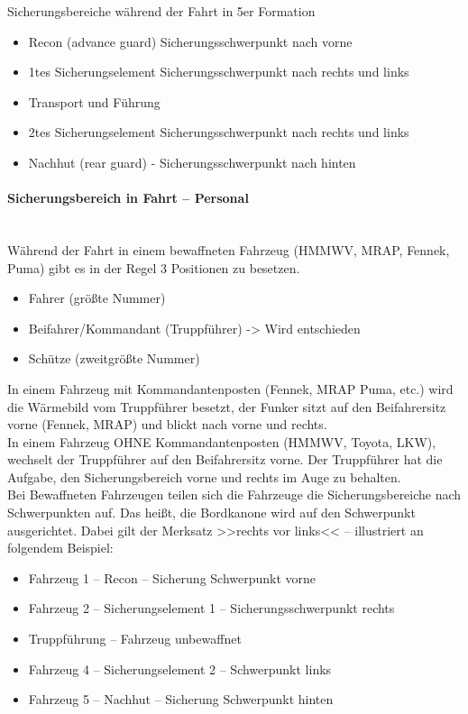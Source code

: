 Sicherungsbereiche während der Fahrt in 5er Formation

	\begin{itemize}
		\item Recon (advance guard) Sicherungsschwerpunkt nach vorne
		\item 1tes Sicherungselement Sicherungsschwerpunkt nach rechts und links
		\item Transport und Führung  
		\item 2tes Sicherungselement Sicherungsschwerpunkt nach rechts und links
		\item Nachhut (rear guard) - Sicherungsschwerpunkt nach hinten
	\end{itemize}

\paragraph{Sicherungsbereich in Fahrt – Personal} \ \\
	Während der Fahrt in einem bewaffneten Fahrzeug (HMMWV, MRAP, Fennek, Puma) gibt es in der Regel 3 Positionen zu besetzen.

	\begin{itemize}
		\item Fahrer (größte Nummer)
		\item Beifahrer/Kommandant (Truppführer) -> Wird entschieden
		\item Schütze (zweitgrößte Nummer)
	\end{itemize}

	In einem Fahrzeug mit Kommandantenposten (Fennek, MRAP Puma, etc.) wird die Wärmebild vom Truppführer besetzt, der Funker sitzt auf den Beifahrersitz vorne (Fennek, MRAP) und blickt nach vorne und rechts. \\
	In einem Fahrzeug OHNE Kommandantenposten (HMMWV, Toyota, LKW), wechselt der Truppführer auf den Beifahrersitz vorne. Der Truppführer hat die Aufgabe, den Sicherungsbereich vorne und rechts im Auge zu behalten. \\
	Bei Bewaffneten Fahrzeugen teilen sich die Fahrzeuge die Sicherungsbereiche nach Schwerpunkten auf. Das heißt, die Bordkanone wird auf den Schwerpunkt ausgerichtet. Dabei gilt der Merksatz >>rechts vor links<< – illustriert an folgendem Beispiel: 

	\begin{itemize}
		\item Fahrzeug 1 – Recon – Sicherung Schwerpunkt vorne
		\item Fahrzeug 2 – Sicherungselement 1 – Sicherungsschwerpunkt rechts
		\item Truppführung – Fahrzeug unbewaffnet
		\item Fahrzeug 4 – Sicherungselement 2 – Schwerpunkt links
		\item Fahrzeug 5 – Nachhut – Sicherung Schwerpunkt hinten
	\end{itemize}

